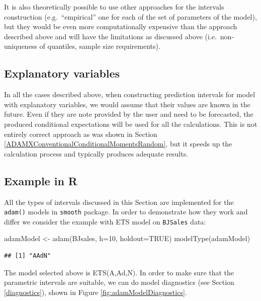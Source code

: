 \documentclass[
]{book}
\newenvironment{Shaded}{\begin{snugshade}}{\end{snugshade}}
\newcommand{\AttributeTok}[1]{\textcolor[rgb]{0.77,0.63,0.00}{#1}}
\newcommand{\ConstantTok}[1]{\textcolor[rgb]{0.00,0.00,0.00}{#1}}
\newcommand{\DecValTok}[1]{\textcolor[rgb]{0.00,0.00,0.81}{#1}}
\newcommand{\FunctionTok}[1]{\textcolor[rgb]{0.00,0.00,0.00}{#1}}
\newcommand{\NormalTok}[1]{#1}
\newcommand{\OtherTok}[1]{\textcolor[rgb]{0.56,0.35,0.01}{#1}}
\theoremstyle{definition}
\theoremstyle{definition}
\theoremstyle{definition}
\theoremstyle{definition}
\theoremstyle{remark}
\begin{document}
It is also theoretically possible to use other approaches for the intervals construction (e.g.~``empirical'' one for each of the set of parameters of the model), but they would be even more computationally expensive than the approach described above and will have the limitations as discussed above (i.e.~non-uniqueness of quantiles, sample size requirements).

\hypertarget{explanatory-variables-1}{%
\subsection{Explanatory variables}\label{explanatory-variables-1}}

In all the cases described above, when constructing prediction intervals for model with explanatory variables, we would assume that their values are known in the future. Even if they are note provided by the user and need to be forecasted, the produced conditional expectations will be used for all the calculations. This is not entirely correct approach as was shown in Section \ref{ADAMXConventionalConditionalMomentsRandom}, but it speeds up the calculation process and typically produces adequate results.

\hypertarget{ADAMForecastingPIExample}{%
\subsection{Example in R}\label{ADAMForecastingPIExample}}

All the types of intervals discussed in this Section are implemented for the \texttt{adam()} models in \texttt{smooth} package. In order to demonstrate how they work and differ we consider the example with ETS model on \texttt{BJSales} data:

\begin{Shaded}
\begin{Highlighting}[]
\NormalTok{adamModel }\OtherTok{\textless{}{-}} \FunctionTok{adam}\NormalTok{(BJsales, }\AttributeTok{h=}\DecValTok{10}\NormalTok{, }\AttributeTok{holdout=}\ConstantTok{TRUE}\NormalTok{)}
\FunctionTok{modelType}\NormalTok{(adamModel)}
\end{Highlighting}
\end{Shaded}

\begin{verbatim}
## [1] "AAdN"
\end{verbatim}

The model selected above is ETS(A,Ad,N). In order to make sure that the parametric intervals are suitable, we can do model diagnostics (see Section \ref{diagnostics}), shown in Figure \ref{fig:adamModelDiagnostics}.
\end{document}

